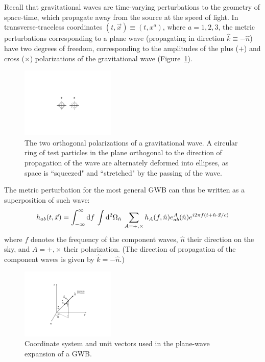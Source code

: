 \documentclass[11pt]{article}
\numberwithin{equation}{section}
\def\be{\begin{equation}}
\def\ee{\end{equation}}
\def\D{{\rm d}}
\begin{document}
Recall that gravitational waves are time-varying 
perturbations to the geometry of space-time, 
which propagate away from the source at the speed 
of light.
In transverse-traceless coordinates
$(t,\vec x)\equiv (t,x^a)$, where $a=1,2,3$,
the metric perturbations corresponding to a 
plane wave (propagating in direction $\hat k\equiv-\hat n$) 
have two degrees of freedom, corresponding to the 
amplitudes of the 
plus ($+$) and cross ($\times$) polarizations of
the gravitational wave (Figure~\ref{f:polarizations}).
%
\begin{figure}[htbp!]
\begin{center}
\includegraphics[width=0.4\textwidth]{Figures/polarizations}
\caption{The two orthogonal polarizations of a gravitational wave.
A circular ring of test particles in the plane orthogonal to 
the direction of propagation of the wave are alternately deformed
into ellipses, as space is ``squeezed" and ``stretched" by the 
passing of the wave.}
\label{f:polarizations}
\end{center}
\end{figure}
%
The metric perturbation for the most general GWB 
can thus be written as a superposition of such 
wave:
%
\be
h_{ab}(t,\vec x) =
\int_{-\infty}^\infty \D f\>
\int \D^2\Omega_{\hat n}\>
\sum_{A=+,\times}
h_A(f,\hat n)e^A_{ab}(\hat n) 
e^{i2\pi f(t+\hat n\cdot \vec x/c)}
\label{e:planewave}
\ee
%
where $f$ denotes the frequency of the 
component waves, $\hat n$ their direction on the
sky, and $A=+,\times$ their polarization.
(The direction of propagation of the component
waves is given by $\hat k=-\hat n$.)
%
\begin{figure}[htbp!]
\begin{center}
\includegraphics[width=0.4\textwidth]{Figures/plane_wave}
\caption{Coordinate system and unit vectors used in the 
plane-wave expansion of a GWB.}
\label{f:plane_wave}
\end{center}
\end{figure}
\end{document}
